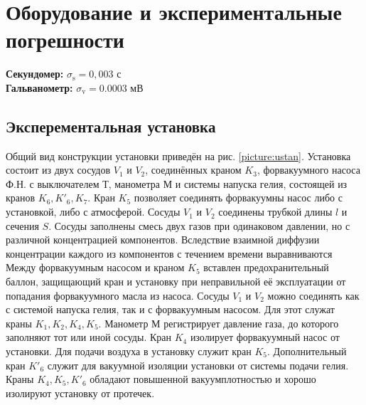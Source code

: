 \documentclass[a4paper,12pt]{article}
\begin{document}
\section{Оборудование и экспериментальные погрешности}

\textbf{Секундомер:} $\sigma_\text{s} = 0,003$ с \\
\textbf{Гальванометр:} $\sigma_\text{v} = 0.0003$ мВ \\

\subsection*{Эксперементальная установка}

Общий вид конструкции установки приведён на рис. \ref{picture:ustan}. Установка состоит из двух сосудов $V_1$ и $V_2$, соединённых краном $K_3$, форвакуумного насоса Ф.Н. с выключателем Т, манометра М и системы напуска гелия, состоящей из кранов $K_6, K'_6, K_7$. Кран $K_5$ позволяет соединять форвакуумны насос либо с установкой, либо с атмосферой. Сосуды $V_1$ и $V_2$ соединены трубкой длины $l$ и сечения $S$. Сосуды заполнены смесь двух газов при одинаковом давлении, но с различной концентрацией компонентов. Вследствие взаимной диффузии концентрации каждого из компонентов с течением времени выравниваются Между форвакуумным насосом и краном $K_5$ вставлен предохранительный баллон, защищающий кран и установку при неправильной её эксплуатации от попадания форвакуумного масла из насоса. Сосуды $V_1$ и $V_2$ можно соединять как с системой напуска гелия, так и с форвакуумным насосом. Для этот служат краны $K_1, K_2, K_4, K_5$. Манометр М регистрирует давление газа, до которого заполняют тот или иной сосуды. Кран $K_4$ изолирует форвакуумный насос от установки. Для подачи воздуха в установку служит кран $K_5$. Дополнительный кран $K'_6$ служит для вакуумной изоляции установки от системы подачи гелия. Краны $K_4, K_5, K'_6$ обладают повышенной вакуумплотностью и хорошо изолируют установку от протечек.
\end{document}
